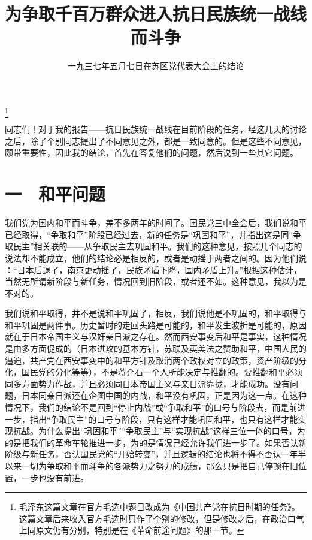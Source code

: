 
\title{为争取千百万群众进入抗日民族统一战线而斗争}
\date{一九三七年五月七日在苏区党代表大会上的结论}
\thanks{毛泽东这篇文章在官方毛选中题目改成为《中国共产党在抗日时期的任务》。这篇文章后来收入官方毛选时只作了个别的修改，但是修改之后，在政治口气上同原文仍有分别，特别是在《革命前途问题》的那一节。}
\maketitle


同志们！对于我的报告——抗日民族统一战线在目前阶段的任务，经这几天的讨论之后，除了个别同志提出了不同意见之外，都是一致同意的。但是这些不同意见，颇带重要性，因此我的结论，首先在答复他们的问题，然后说到一些其它问题。

\section{一　和平问题}

我们党为国内和平而斗争，差不多两年的时间了。国民党三中全会后，我们说和平已经取得，“争取和平”阶段已经过去，新的任务是“巩固和平”，并指出这是同“争取民主”相关联的——从争取民主去巩固和平。我们的这种意见，按照几个同志的说法却不能成立，他们的结论必是相反的，或者是动摇于两者之间的。因为他们说
：“日本后退了，南京更动摇了，民族矛盾下降，国内矛盾上升。”根据这种估计，当然无所谓新阶段与新任务，情况回到旧阶段，或者还不如。这种意见，我以为是不对的。

我们说和平取得，并不是说和平巩固了，相反，我们说他是不巩固的，和平取得与和平巩固是两件事。历史暂时的走回头路是可能的，和平发生波折是可能的，原因就在于日本帝国主义与汉奸亲日派之存在。然而西安事变后和平是事实，这种情况是由多方面促成的（日本进攻的基本方针，苏联及英美法之赞助和平，中国人民的逼迫，共产党在西安事变中的和平方针及取消两个政权对立的政策，资产阶级的分化，国民党的分化等等），不是蒋介石一个人所能决定与推翻的。要推翻和平必须同多方面势力作战，并且必须同日本帝国主义与亲日派靠拢，才能成功。没有问题，日本同亲日派还在企图中国的内战，和平没有巩固，正是因为这一点。在这种情况下，我们的结论不是回到“停止内战”或“争取和平”的口号与阶段去，而是前进一步，指出“争取民主”的口号与阶段，只有这样才能巩固和平，也只有这样才能实现抗战。为什么提出“巩固和平”“争取民主”与“实现抗战”这样三位一体的口号，为的是把我们的革命车轮推进一步，为的是情况己经允许我们进一步了。如果否认新阶级与新任务，否认国民党的“开始转变”，并且逻辑的结论也将不得不否认一年半以来一切为争取和平而斗争的各派势力之努力的成绩，那么只是把自己停顿在旧位置，一步也没有前进。

